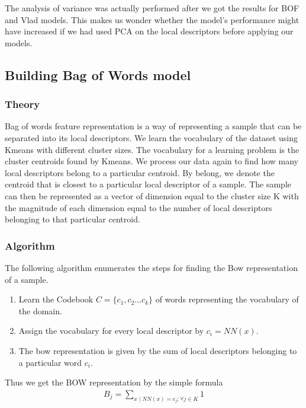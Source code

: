 \documentclass[final,leqno,onefignum,onetabnum]{siamltexmm}
\begin{document}
The analysis of variance was actually performed after we got the results for BOF and Vlad models.  This makes us wonder whether the model's performance might have increased if we had used PCA on the local descriptors before applying our models.

\subsection{Building Bag of Words model}
\subsubsection{Theory}
Bag of words feature representation is a way of representing a sample that can be separated into its local descriptors.  
We learn the vocabulary of the dataset using Kmeans with different cluster sizes.
The vocabulary for a learning problem is the cluster centroids found by Kmeans.
We process our data again to find how many local descriptors belong to a particular centroid.
By belong, we denote the centroid that is closest to a particular local descriptor of a sample.
The sample can then be represented as a vector of dimension equal to the cluster size K with the magnitude of each dimension equal to the number of local descriptors belonging to that particular centroid.

\subsubsection{Algorithm}
The following algorithm enumerates the steps for finding the Bow representation of a sample.
\begin{enumerate}
  \item Learn the Codebook $ C = \{c_{1}, c_{2} \ldots c_{k}\} $ of words representing the vocabulary of the domain.
  \item Assign the vocabulary for every local descriptor by $ c_{i} = NN(x) $.
  \item The bow representation is given by the sum of local descriptors belonging to a particular word $ c_{i} $.
\end{enumerate}

Thus we get the BOW representation by the simple formula
\begin{align*}
  B_{j} = \sum_{x \mid NN(x) = c_{j};  \forall j \in K} 1
\end{align*}
\end{document}
